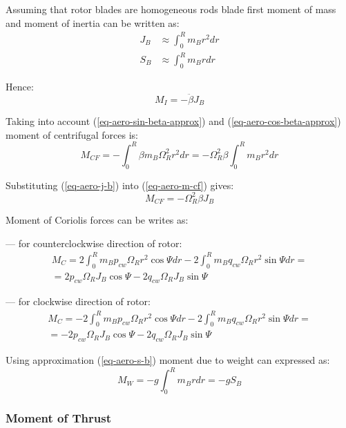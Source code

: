Assuming that rotor blades are homogeneous rods blade first moment of mass and moment of inertia can be written as: \cite{NASA-TT-F-494}
\begin{align}
  \label{eq-aero-j-b}
  J_B &\approx \int_{0}^{R} m_B r^2 dr \\
  \label{eq-aero-s-b}
  S_B &\approx \int_{0}^{R} m_B r dr
\end{align}

Hence:
\begin{equation}
  M_I = - \ddot \beta J_B
\end{equation}

Taking into account (\ref{eq-aero-sin-beta-approx}) and (\ref{eq-aero-cos-beta-approx}) moment of centrifugal forces is:
\begin{equation}
  \label{eq-aero-m-cf}
  M_{CF} =
  - \int_{0}^{R} \beta m_B \Omega_R^2 r^2 dr =
  - \Omega_R^2 \beta \int_{0}^{R} m_B r^2 dr
\end{equation}

Substituting (\ref{eq-aero-j-b}) into (\ref{eq-aero-m-cf}) gives:
\begin{equation}
  M_{CF} = - \Omega_R^2 \beta J_B
\end{equation}

Moment of Coriolis forces can be writes as:

--- for counterclockwise direction of rotor:
\begin{multline}
  M_C =
    2 \int_{0}^{R} m_B p_{cw} \Omega_R r^2 \cos \Psi dr
  - 2 \int_{0}^{R} m_B q_{cw} \Omega_R r^2 \sin \Psi dr
  = \\ =
  2 p_{cw} \Omega_R J_B \cos \Psi - 2 q_{cw} \Omega_R J_B \sin \Psi
\end{multline}

--- for clockwise direction of rotor:
\begin{multline}
  M_C =
  - 2 \int_{0}^{R} m_B p_{cw} \Omega_R r^2 \cos \Psi dr
  - 2 \int_{0}^{R} m_B q_{cw} \Omega_R r^2 \sin \Psi dr
  = \\ =
  -2 p_{cw} \Omega_R J_B \cos \Psi - 2 q_{cw} \Omega_R J_B \sin \Psi
\end{multline}

Using approximation (\ref{eq-aero-s-b}) moment due to weight can expressed as:
\begin{equation}
  M_W = -g \int_{0}^{R} m_B r dr = -g S_B
\end{equation}

\subsubsection{Moment of Thrust}

